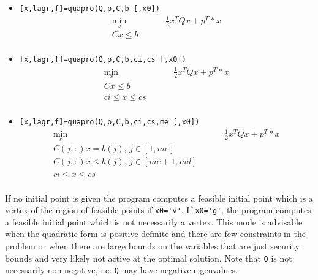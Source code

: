 \begin{mandescription}
\begin{itemize}
\item \verb![x,lagr,f]=quapro(Q,p,C,b [,x0])!
\begin{equation*}
\begin{split}
  \min_{x}& \hspace{1cm}  \frac{1}{2} x^T Q x + p^T *x \\
  C x \le b  & \\
\end{split}
\end{equation*}
\item  \verb![x,lagr,f]=quapro(Q,p,C,b,ci,cs [,x0])!
\begin{equation*}
\begin{split}
  \min_{x} &\hspace{1cm}  \frac{1}{2} x^T Q x + p^T *x \\
  C x \le b  & \\
  ci \le x \le cs & \\
\end{split}
\end{equation*}
\item \verb![x,lagr,f]=quapro(Q,p,C,b,ci,cs,me [,x0])!
\begin{equation*}
\begin{split}
  \min_{x} &\hspace{1cm}  \frac{1}{2} x^T Q x + p^T *x \\
  C(j,:) x = b(j) , \,  j \in [1,me] & \\
  C(j,:) x \le b(j), \, j \in [me+1,md] & \\
  ci \le x \le cs &\\
\end{split}
\end{equation*}
\end{itemize}
  If no initial point is given the
  program computes a feasible initial point
  which is a vertex of the region of feasible points if
  \verb!x0='v'!.
  If \verb!x0='g'!, the program computes a feasible initial 
  point which is not necessarily a vertex. This mode is
  advisable when the quadratic form is positive
  definite and there are  few constraints in
  the problem or when there are large bounds
  on the variables that are just security bounds and
  very likely not active at the optimal solution.
  Note that \verb!Q! is not necessarily non-negative, i.e.
  \verb!Q! may have negative eigenvalues.
\end{mandescription}
